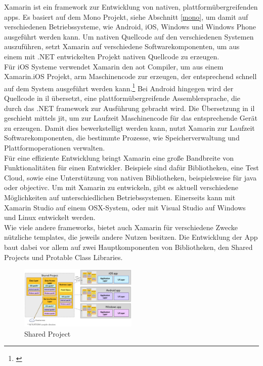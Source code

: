 Xamarin ist ein \gls{framework} zur Entwicklung von nativen, plattformübergreifenden \glspl{app}. Es basiert auf dem Mono Projekt, siehe Abschnitt \eqref{mono}, um damit auf verschiedenen Betriebssysteme, wie Android, iOS, Windows und Windows Phone ausgeführt werden kann. Um nativen Quellcode auf den verschiedenen Systemen auszuführen, setzt Xamarin auf verschiedene Softwarekomponenten, um aus einem mit .NET entwickelten Projekt nativen Quellcode zu erzeugen.\\
Für iOS Systeme verwendet Xamarin den \gls{aot} Compiler, um aus einem Xamarin.iOS Projekt, \gls{arm} Maschinencode zur erzeugen, der entsprechend schnell auf dem System ausgeführt werden kann.\footnote{\citep[vgl.][Introduction to Mobile Development - Xamarin]{Xamarin.Introductionto}\label{note3x}} Bei Android hingegen wird der Quellcode in \gls{il} übersetzt, eine plattformübergreifende Assemblersprache, die durch das .NET \gls{framework} zur Ausführung gebracht wird. Die Übersetzung in \gls{il} geschieht mittels \gls{jit}, um zur Laufzeit Maschinencode für das entsprechende Gerät zu erzeugen. Damit dies bewerkstelligt werden kann, nutzt Xamarin zur Laufzeit Softwarekomponenten, die bestimmte Prozesse, wie Speicherverwaltung und Plattformoperationen verwalten.\\
Für eine effiziente Entwicklung bringt Xamarin eine große Bandbreite von Funktionalitäten für einen Entwickler. Beispiele sind dafür Bibliotheken, eine Test Cloud, sowie eine Unterstützung von nativen Bibliotheken, beispielsweise für \gls{java} oder \gls{objectivc}. Um mit Xamarin zu entwickeln, gibt es aktuell verschiedene Möglichkeiten auf unterschiedlichen Betriebssystemen. Einerseits kann mit Xamarin Studio auf einem OSX-System, oder mit Visual Studio auf Windows und Linux entwickelt werden.\\
Wie viele andere \glspl{framework}, bietet auch Xamarin für verschiedene Zwecke nützliche \glspl{template}, die jeweils andere Nutzen besitzen. Die Entwicklung der App baut dabei vor allem auf zwei Hauptkomponenten von Bibliotheken, den Shared Projects und Protable Class Libraries.

\begin{figure}
	\begin{center}
		\includegraphics[width=0.5\textwidth]{images/technische_grundlagen/SharedAssetProject.png}
	\end{center}
	\caption{Shared Project \cite{Xamarin.SharedProjects}}
	\label{fig:shared}
\end{figure}

